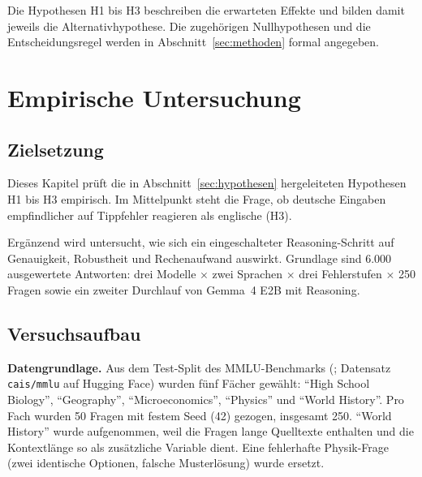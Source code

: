 \documentclass[a4paper,titlepage]{article}
\numberwithin{equation}{section} %
\begin{document}
Die Hypothesen H1 bis H3 beschreiben die erwarteten Effekte und bilden damit jeweils die Alternativhypothese. Die zugehörigen Nullhypothesen und die Entscheidungsregel werden in Abschnitt~\ref{sec:methoden} formal angegeben.

\newpage

\section{Empirische Untersuchung}\label{sec:empirie}


\subsection{Zielsetzung}\label{sec:zielsetzung}

Dieses Kapitel prüft die in Abschnitt~\ref{sec:hypothesen} hergeleiteten Hypothesen H1 bis H3 empirisch. Im Mittelpunkt steht die Frage, ob deutsche Eingaben empfindlicher auf Tippfehler reagieren als englische (H3).

Ergänzend wird untersucht, wie sich ein eingeschalteter Reasoning-Schritt auf Genauigkeit, Robustheit und Rechenaufwand auswirkt. Grundlage sind 6.000 ausgewertete Antworten: drei Modelle $\times$ zwei Sprachen $\times$ drei Fehlerstufen $\times$ 250 Fragen sowie ein zweiter Durchlauf von Gemma~4 E2B mit Reasoning.


\subsection{Versuchsaufbau}\label{sec:versuchsaufbau}

\textbf{Datengrundlage.} Aus dem Test-Split des MMLU-Benchmarks (\citealp{hendrycks_measuring_2021}; Datensatz \texttt{cais/mmlu} auf Hugging Face) wurden fünf Fächer gewählt: "`High School Biology"', "`Geography"', "`Microeconomics"', "`Physics"' und "`World History"'. Pro Fach wurden 50 Fragen mit festem Seed (42) gezogen, insgesamt 250. "`World History"' wurde aufgenommen, weil die Fragen lange Quelltexte enthalten und die Kontextlänge so als zusätzliche Variable dient. Eine fehlerhafte Physik-Frage (zwei identische Optionen, falsche Musterlösung) wurde ersetzt.
\end{document}
